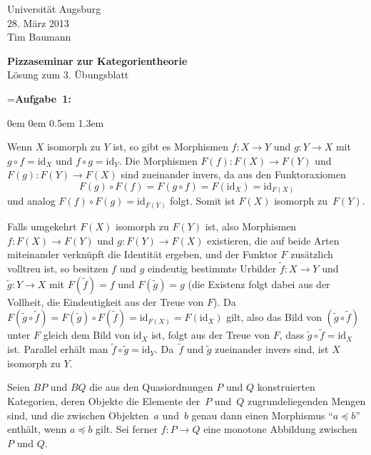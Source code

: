 \documentclass[a4paper,ngerman]{scrartcl}
\theoremstyle{definition}
\theoremstyle{plain}
\theoremstyle{remark}
\newcommand{\id}{\mathrm{id}}
\begin{document}
\vspace*{-4em}
\begin{flushright}Universität Augsburg \\ 28. März 2013 \\ Tim Baumann\end{flushright}

\begin{center}\Large \textbf{Pizzaseminar zur Kategorientheorie} \\
Lösung zum 3. Übungsblatt
\end{center}
\vspace{2em}

\newbox{\mybox}
\setbox\mybox=\hbox{\textbf{Aufgabe 1:}}

\begin{list}{}{0em \leftmargin0em \itemindent0.5em \itemsep 1.3em}
\item[\textbf{Aufgabe 1:}]\mbox{}

Wenn $X$ isomorph zu $Y$ ist, so gibt es Morphismen $f : X \to Y$ und $g : Y \to X$ mit $g \circ f = \id_X$ und $f \circ g = \id_Y$.
Die Morphismen $F(f):F(X) \to F(Y)$ und $F(g):F(Y) \to F(X)$ sind zueinander invers, da aus den Funktoraxiomen
\[F(g) \circ F(f) = F(g \circ f) = F(\id_X) = \id_{F(X)}\]
und analog $F(f) \circ F(g) = \id_{F(Y)}$ folgt. Somit ist $F(X)$ isomorph zu~$F(Y)$.

Falls umgekehrt $F(X)$ isomorph zu $F(Y)$ ist, also Morphismen $f : F(X) \to F(Y)$ und $g : F(Y) \to F(X)$ existieren, die auf beide Arten miteinander verknüpft die Identität ergeben, und der Funktor $F$ zusätzlich volltreu ist, so besitzen $f$ und $g$ eindeutig bestimmte Urbilder $\widetilde{f} : X \to Y$ und $\widetilde{g} : Y \to X$ mit $F(\widetilde{f}) = f$ und $F(\widetilde{g}) = g$ (die Existenz folgt dabei aus der Vollheit, die Eindeutigkeit aus der Treue von $F$). Da
$F(\widetilde{g} \circ \widetilde{f}) = F(\widetilde{g}) \circ F(\widetilde{f}) = \id_{F(X)} = F(\id_X)$ gilt, also das Bild von $(\widetilde{g} \circ \widetilde{f})$ unter $F$ gleich dem Bild von $\id_X$ ist, folgt aus der Treue von $F$, dass $\widetilde{g} \circ \widetilde{f} = \id_X$ ist. Parallel erhält man $\widetilde{f} \circ \widetilde{g} = \id_Y$. Da~$\widetilde{f}$ und $\widetilde{g}$ zueinander invers sind, ist $X$ isomorph zu $Y$.

\item[\textbf{Aufgabe 2:}]\mbox{}

Seien $BP$ und $BQ$ die aus den Quasiordnungen $P$ und $Q$ konstruierten Kategorien, deren Objekte die Elemente der~$P$ und~$Q$ zugrundeliegenden Mengen sind, und die zwischen Objekten~$a$ und~$b$ genau dann einen Morphismus "`$a \preceq b$"' enthält, wenn $a \preceq b$ gilt. Sei ferner $f:P \to Q$ eine monotone Abbildung zwischen $P$ und $Q$.


\end{list}
\end{document}
